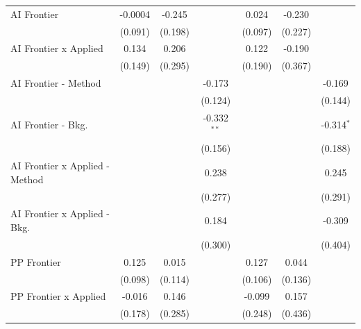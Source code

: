 \begin{tabular}{lcccccc}
   AI Frontier                    & -0.0004      & -0.245       &               & 0.024        & -0.230       &   \\   
                                  & (0.091)      & (0.198)      &               & (0.097)      & (0.227)      &   \\   
   AI Frontier x Applied          & 0.134        & 0.206        &               & 0.122        & -0.190       &   \\   
                                  & (0.149)      & (0.295)      &               & (0.190)      & (0.367)      &   \\   
   AI Frontier - Method           &              &              & -0.173        &              &              & -0.169\\   
                                  &              &              & (0.124)       &              &              & (0.144)\\   
   AI Frontier - Bkg.             &              &              & -0.332$^{**}$ &              &              & -0.314$^{*}$\\   
                                  &              &              & (0.156)       &              &              & (0.188)\\   
   AI Frontier x Applied - Method &              &              & 0.238         &              &              & 0.245\\   
                                  &              &              & (0.277)       &              &              & (0.291)\\   
   AI Frontier x Applied - Bkg.   &              &              & 0.184         &              &              & -0.309\\   
                                  &              &              & (0.300)       &              &              & (0.404)\\   
   PP Frontier                    & 0.125        & 0.015        &               & 0.127        & 0.044        &   \\   
                                  & (0.098)      & (0.114)      &               & (0.106)      & (0.136)      &   \\   
   PP Frontier x Applied          & -0.016       & 0.146        &               & -0.099       & 0.157        &   \\   
                                  & (0.178)      & (0.285)      &               & (0.248)      & (0.436)      &   \\   

\end{tabular}
